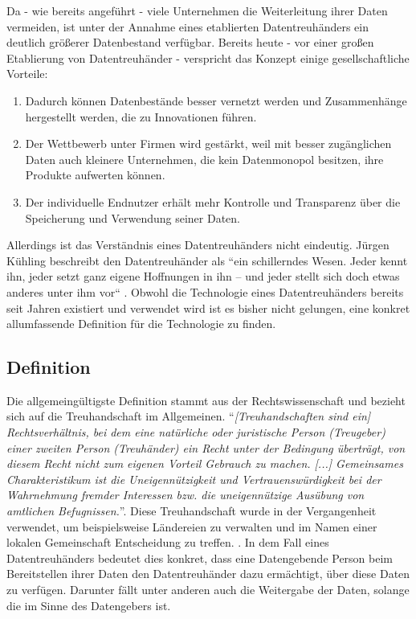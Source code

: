 \documentclass{scrreprt}
\begin{document}
Da - wie bereits angeführt - viele Unternehmen die Weiterleitung ihrer Daten vermeiden, ist unter der Annahme eines etablierten Datentreuhänders ein deutlich größerer Datenbestand verfügbar. Bereits heute - vor einer großen Etablierung von Datentreuhänder - verspricht das Konzept einige gesellschaftliche Vorteile: \cite{dt-richter2020ddvtalk}
\begin{enumerate}
    \item Dadurch können Datenbestände besser vernetzt werden und Zusammenhänge hergestellt werden, die zu Innovationen führen.
    \item Der Wettbewerb unter Firmen wird gestärkt, weil mit besser zugänglichen Daten auch kleinere Unternehmen, die kein Datenmonopol besitzen, ihre Produkte aufwerten können.
    \item Der individuelle Endnutzer erhält mehr Kontrolle und Transparenz über die Speicherung und Verwendung seiner Daten.
\end{enumerate}

Allerdings ist das Verständnis eines Datentreuhänders nicht eindeutig. Jürgen Kühling beschreibt den Datentreuhänder als ``ein schillerndes Wesen. Jeder kennt ihn, jeder setzt ganz eigene Hoffnungen in ihn – und jeder stellt sich doch etwas anderes unter ihm vor`` \cite{dt-kuhling2021datentreuhander}. Obwohl die Technologie eines Datentreuhänders bereits seit Jahren existiert und verwendet wird \cite{dt-hardinges2018data} ist es bisher nicht gelungen, eine konkret allumfassende Definition für die Technologie zu finden.

\subsection{Definition}
Die allgemeingültigste Definition stammt aus der Rechtswissenschaft und bezieht sich auf die Treuhandschaft im Allgemeinen. ``\textit{[Treuhandschaften sind ein] Rechtsverhältnis, bei dem eine natürliche oder juristische Person (Treugeber) einer zweiten Person (Treuhänder) ein Recht unter der Bedingung überträgt, von diesem Recht nicht zum eigenen Vorteil Gebrauch zu machen. [...] Gemeinsames Charakteristikum ist die Uneigennützigkeit und Vertrauenswürdigkeit bei der Wahrnehmung fremder Interessen bzw. die uneigennützige Ausübung von amtlichen Befugnissen.}''\cite{dt-beeck2013treuhandschaft}. Diese Treuhandschaft wurde in der Vergangenheit verwendet, um beispielsweise Ländereien zu verwalten und im Namen einer lokalen Gemeinschaft Entscheidung zu treffen. \cite{dt-hardinges2018data}. In dem Fall eines Datentreuhänders bedeutet dies konkret, dass eine Datengebende Person beim Bereitstellen ihrer Daten den Datentreuhänder dazu ermächtigt, über diese Daten zu verfügen. Darunter fällt unter anderen auch die Weitergabe der Daten, solange die im Sinne des Datengebers ist. 
\end{document}
